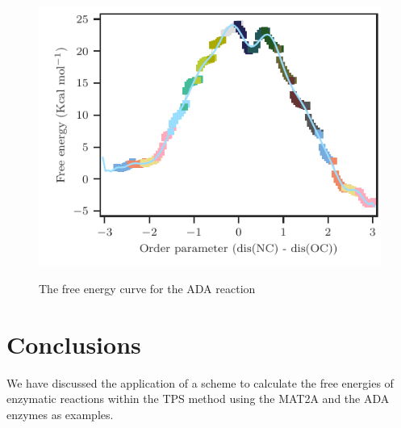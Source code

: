 \documentclass[journal=jpcbfk,manuscript=article,layout=twocolumn]{achemso}
\begin{document}
\begin{figure}[ht!]
\includegraphics[scale=1.0]{./figures/ada-fenergy.pdf}
\label{fig:ada-fenergy}
\caption{The free energy curve for the ADA reaction}
\end{figure}
\section{Conclusions}
We have discussed the application of a scheme to calculate the 
free energies of enzymatic reactions within the TPS method using the MAT2A
and the ADA enzymes as examples. 

\begin{acknowledgement}


\end{acknowledgement}

\begin{suppinfo}


\end{suppinfo}


\end{document}
